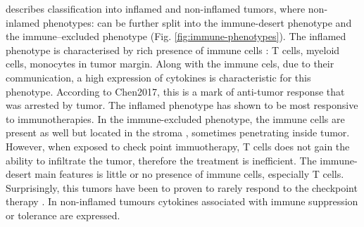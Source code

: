 \documentclass[12pt,]{book}
\theoremstyle{definition}
\theoremstyle{definition}
\theoremstyle{definition}
\theoremstyle{remark}
\begin{document}
\citet{Chen2017} describes classification into inflamed and non-inflamed
tumors, where non-inlamed phenotypes: can be further split into the
immune-desert phenotype and the immune--excluded phenotype (Fig.
\ref{fig:immune-phenotypes}). The inflamed phenotype is characterised by
rich presence of immune cells : T cells, myeloid cells, monocytes in
tumor margin. Along with the immune cels, due to their communication, a
high expression of cytokines is characteristic for this phenotype.
According to Chen2017, this is a mark of anti-tumor response that was
arrested by tumor. The inflamed phenotype has shown to be most
responsive to immunotherapies. In the immune-excluded phenotype, the
immune cells are present as well but located in the stroma
\citep{Herbst2014}, sometimes penetrating inside tumor. However, when
exposed to check point immuotherapy, T cells does not gain the ability
to infiltrate the tumor, therefore the treatment is inefficient. The
immune-desert main features is little or no presence of immune cells,
especially T cells. Surprisingly, this tumors have been to proven to
rarely respond to the checkpoint therapy \citep{Herbst2014}. In
non-inflamed tumours cytokines associated with immune suppression or
tolerance are expressed.
\end{document}
